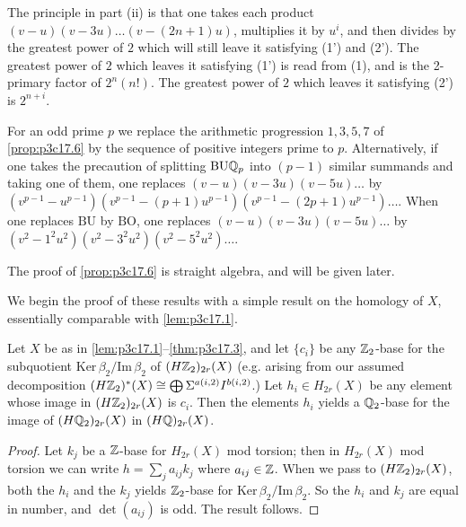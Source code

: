 \documentclass[../main]{subfiles}
\begin{document}
The principle in part (ii) is that one takes each product $(v - u)(v - 3u)\ldots(v - (2n + 1)u)$, multiplies it by $u^i$, and then divides by the greatest power of $2$ which will still leave it satisfying (1') and (2'). The greatest power of $2$ which leaves it satisfying (1') is read from (1), and is the 2-primary factor of $2^n(n!)$. The greatest power of $2$ which leaves it satisfying (2') is $2^{n + i}$. 

\begin{remark*}
For an odd prime $p$ we replace the arithmetic progression $1, 3, 5, 7$ of \ref{prop:p3c17.6} by the sequence of positive integers prime to $p$. Alternatively, if one takes the precaution of splitting $\mathrm{BU}\mathbb{Q}_p$ into $(p - 1)$ similar summands and taking one of them, one replaces $(v - u)(v - 3u)(v - 5u) \ldots$ by $(v^{p - 1} - u^{p - 1}) (v^{p - 1} - (p + 1)u^{p-1}) (v^{p - 1} - (2 p + 1)u^{p - 1}) \ldots$. When one replaces $\mathrm{BU}$ by $\mathrm{BO}$, one replaces $(v - u)(v - 3u)(v - 5u) \ldots$ by $(v^2 - 1^2 u^2)(v^2 - 3^2 u^2) (v^2 - 5^2 u^2)\ldots$. 
\end{remark*}

The proof of \ref{prop:p3c17.6} is straight algebra, and will be given later.

We begin the proof of these results with a simple result on the homology of $X$, essentially comparable with \ref{lem:p3c17.1}. 

\begin{lemma}
\label{lem:p3c17.7}
Let $X$ be as in \ref{lem:p3c17.1}--\ref{thm:p3c17.3}, and let $\{c_i\}$ be any $\mathbb{Z}_2$-base for the subquotient $\mathrm{Ker} \, \beta_2/\mathrm{Im} \, \beta_2$ of $(H\mathbb{Z}_2)_{2r}(X)$ (e.g. arising from our assumed decomposition $(H \mathbb{Z}_2)^\ast(X) \cong \bigoplus \Sigma^{a(i, 2)} I^{b(i, 2)}$.) Let $h_i \in H_{2r}(X)$ be any element whose image in $(H \mathbb{Z}_2)_{2r}(X)$ is $c_i$. Then the elements $h_i$ yields a $\mathbb{Q}_2$-base for the image of $(H \mathbb{Q}_2)_{2r}(X)$ in $(H \mathbb{Q})_{2r}(X)$.
\end{lemma}

\begin{proof}
Let $k_j$ be a $\mathbb{Z}$-base for $H_{2r}(X)$ mod torsion; then in $H_{2r}(X)$ mod torsion we can write $\displaystyle h = \sum_j a_{ij} k_j$ where $a_{ij} \in \mathbb{Z}$. When we pass to $(H \mathbb{Z}_2)_{2r}(X)$, both the $h_i$ and the $k_j$ yields $\mathbb{Z}_2$-base for $\mathrm{Ker} \, \beta_2/\mathrm{Im} \, \beta_2$. So the $h_i$ and $k_j$ are equal in number, and $\det(a_{ij})$ is odd. The result follows.
\end{proof}
\end{document}
